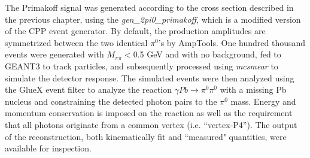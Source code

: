 The Primakoff signal was generated according to the cross section
described in the previous chapter, using the
\emph{gen\_2pi0\_primakoff}, which is a modified version of the CPP event generator. By default, the production amplitudes are
symmetrized between the two identical $\pi^0$'s by AmpTools. One
hundred thousand events were generated with $M_{\pi\pi}<$0.5 GeV and
with no background, fed to GEANT3 to track particles, and subsequently
processed using \emph{mcsmear} to simulate the detector response. The
simulated events were then analyzed using the GlueX event filter to
analyze the reaction $\gamma Pb \rightarrow \pi^0 \pi^0$ with a
missing Pb nucleus and constraining the detected photon pairs to the
$\pi^0$ mass. Energy and momentum conservation is imposed on the reaction as well as the requirement that all photons originate from a common vertex (i.e. ``vertex-P4''). The output of the reconstruction, both kinematically
fit and ``measured" quantities, were available for inspection.

